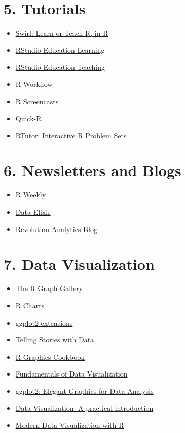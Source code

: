 \documentclass[
  letterpaper,
  DIV=11,
  numbers=noendperiod]{scrreprt}
\providecommand{\tightlist}{%
  \setlength{\itemsep}{0pt}\setlength{\parskip}{0pt}}\usepackage{longtable,booktabs,array}
\begin{document}
\section{5. Tutorials}\label{tutorials}

\begin{itemize}
\tightlist
\item
  \href{https://swirlstats.com/}{Swirl: Learn or Teach R, in R}
\item
  \href{https://education.rstudio.com/learn/}{RStudio Education
  Learning}
\item
  \href{https://education.rstudio.com/teach/}{RStudio Education
  Teaching}
\item
  \href{https://hbiostat.org/rflow/}{R Workflow}
\item
  \href{https://www.rscreencasts.com/}{R Screencasts}
\item
  \href{https://www.statmethods.net/}{Quick-R}
\item
  \href{https://skranz.github.io/RTutor/}{RTutor: Interactive R Problem
  Sets}
\end{itemize}

\section{6. Newsletters and Blogs}\label{newsletters-and-blogs}

\begin{itemize}
\tightlist
\item
  \href{https://rweekly.org/}{R Weekly}
\item
  \href{https://dataelixir.com/}{Data Elixir}
\item
  \href{https://blog.revolutionanalytics.com/}{Revolution Analytics
  Blog}
\end{itemize}

\section{7. Data Visualization}\label{data-visualization}

\begin{itemize}
\tightlist
\item
  \href{https://r-graph-gallery.com/}{The R Graph Gallery}
\item
  \href{https://r-charts.com/}{R Charts}
\item
  \href{https://exts.ggplot2.tidyverse.org/}{ggplot2 extensions}
\item
  \href{https://tellingstorieswithdata.com/}{Telling Stories with Data}
\item
  \href{https://r-graphics.org/}{R Graphics Cookbook}
\item
  \href{https://clauswilke.com/dataviz/}{Fundamentals of Data
  Visualization}
\item
  \href{https://ggplot2-book.org/}{ggplot2: Elegant Graphics for Data
  Analysis}
\item
  \href{https://socviz.co/}{Data Visualization: A practical
  introduction}
\item
  \href{https://rkabacoff.github.io/datavis/}{Modern Data Visualization
  with R}
\end{itemize}
\end{document}
